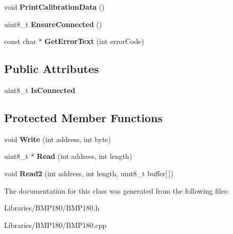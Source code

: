 \begin{DoxyCompactItemize}
\item 
\hypertarget{class_b_m_p180_a1739c26c21737920771532e5cd5c4d3d}{}void {\bfseries Print\+Calibration\+Data} ()\label{class_b_m_p180_a1739c26c21737920771532e5cd5c4d3d}

\item 
\hypertarget{class_b_m_p180_ab8ef034f33153809afb15c1b4df1387a}{}uint8\+\_\+t {\bfseries Ensure\+Connected} ()\label{class_b_m_p180_ab8ef034f33153809afb15c1b4df1387a}

\item 
\hypertarget{class_b_m_p180_ace5e813b9936ef2075d6f088b9ceeabf}{}const char $\ast$ {\bfseries Get\+Error\+Text} (int error\+Code)\label{class_b_m_p180_ace5e813b9936ef2075d6f088b9ceeabf}

\end{DoxyCompactItemize}
\subsection*{Public Attributes}
\begin{DoxyCompactItemize}
\item 
\hypertarget{class_b_m_p180_a7fe61f0655d615011abdf84431145a95}{}uint8\+\_\+t {\bfseries Is\+Connected}\label{class_b_m_p180_a7fe61f0655d615011abdf84431145a95}

\end{DoxyCompactItemize}
\subsection*{Protected Member Functions}
\begin{DoxyCompactItemize}
\item 
\hypertarget{class_b_m_p180_a4282e16c218dcbd6c1f4e45adad47874}{}void {\bfseries Write} (int address, int byte)\label{class_b_m_p180_a4282e16c218dcbd6c1f4e45adad47874}

\item 
\hypertarget{class_b_m_p180_a66dc9d1ba888abe9389248c5b1d0b418}{}uint8\+\_\+t $\ast$ {\bfseries Read} (int address, int length)\label{class_b_m_p180_a66dc9d1ba888abe9389248c5b1d0b418}

\item 
\hypertarget{class_b_m_p180_a20c19a359b882a25495b21bcbfb5f6f3}{}void {\bfseries Read2} (int address, int length, uint8\+\_\+t buffer\mbox{[}$\,$\mbox{]})\label{class_b_m_p180_a20c19a359b882a25495b21bcbfb5f6f3}

\end{DoxyCompactItemize}


The documentation for this class was generated from the following files\+:\begin{DoxyCompactItemize}
\item 
Libraries/\+B\+M\+P180/B\+M\+P180.\+h\item 
Libraries/\+B\+M\+P180/B\+M\+P180.\+cpp\end{DoxyCompactItemize}
